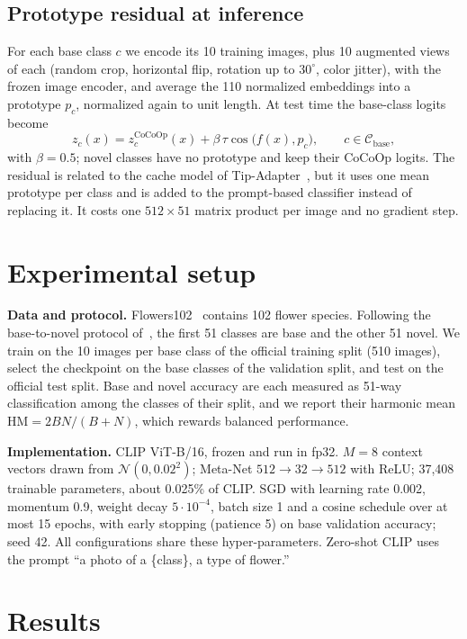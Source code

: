 \documentclass[10pt,twocolumn,a4paper]{article}
\newcommand{\para}[1]{\textbf{#1}\hspace{0.4em}}
\begin{document}
\subsection{Prototype residual at inference}
For each base class $c$ we encode its 10 training images, plus 10 augmented views of each
(random crop, horizontal flip, rotation up to $30^\circ$, color jitter), with the frozen
image encoder, and average the 110 normalized embeddings into a prototype $p_c$, normalized
again to unit length. At test time the base-class logits become
\begin{equation}
  z_c(x) = z_c^{\mathrm{CoCoOp}}(x) + \beta\,\tau\cos\big(f(x),p_c\big),
  \qquad c \in \mathcal{C}_{\mathrm{base}},
\end{equation}
with $\beta = 0.5$; novel classes have no prototype and keep their CoCoOp logits. The
residual is related to the cache model of Tip-Adapter~\cite{tipadapter}, but it uses one
mean prototype per class and is added to the prompt-based classifier instead of replacing
it. It costs one $512 \times 51$ matrix product per image and no gradient step.

\section{Experimental setup}

\para{Data and protocol.} Flowers102~\cite{flowers} contains 102 flower species. Following
the base-to-novel protocol of~\cite{cocoop}, the first 51 classes are base and the other 51
novel. We train on the 10 images per base class of the official training split (510
images), select the checkpoint on the base classes of the validation split, and test on
the official test split. Base and novel accuracy are each measured as 51-way
classification among the classes of their split, and we report their harmonic mean
$\mathrm{HM} = 2BN/(B+N)$, which rewards balanced performance.

\para{Implementation.} CLIP ViT-B/16, frozen and run in fp32. $M = 8$ context vectors
drawn from $\mathcal{N}(0, 0.02^2)$; Meta-Net $512 \to 32 \to 512$ with ReLU; 37,408
trainable parameters, about 0.025\% of CLIP. SGD with learning rate 0.002, momentum 0.9,
weight decay $5\cdot10^{-4}$, batch size 1 and a cosine schedule over at most 15 epochs,
with early stopping (patience 5) on base validation accuracy; seed 42. All configurations
share these hyper-parameters. Zero-shot CLIP uses the prompt ``a photo of a \{class\}, a
type of flower.''

\section{Results}
\end{document}
